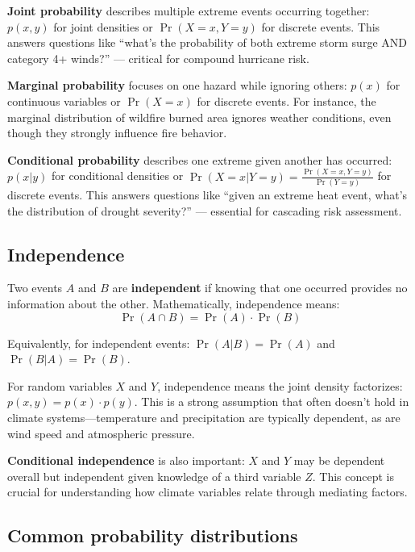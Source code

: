 \documentclass[
  letterpaper,
  DIV=11,
  numbers=noendperiod]{scrreprt}
\begin{document}
\textbf{Joint probability} describes multiple extreme events occurring
together: \(p(x, y)\) for joint densities or \(\Pr(X = x, Y = y)\) for
discrete events. This answers questions like ``what's the probability of
both extreme storm surge AND category 4+ winds?'' --- critical for
compound hurricane risk.

\textbf{Marginal probability} focuses on one hazard while ignoring
others: \(p(x)\) for continuous variables or \(\Pr(X = x)\) for discrete
events. For instance, the marginal distribution of wildfire burned area
ignores weather conditions, even though they strongly influence fire
behavior.

\textbf{Conditional probability} describes one extreme given another has
occurred: \(p(x | y)\) for conditional densities or
\(\Pr(X = x | Y = y) = \frac{\Pr(X = x, Y = y)}{\Pr(Y = y)}\) for
discrete events. This answers questions like ``given an extreme heat
event, what's the distribution of drought severity?'' --- essential for
cascading risk assessment.

\subsection{Independence}\label{independence}

Two events \(A\) and \(B\) are \textbf{independent} if knowing that one
occurred provides no information about the other. Mathematically,
independence means: \[\Pr(A \cap B) = \Pr(A) \cdot \Pr(B)\]

Equivalently, for independent events: \(\Pr(A | B) = \Pr(A)\) and
\(\Pr(B | A) = \Pr(B)\).

For random variables \(X\) and \(Y\), independence means the joint
density factorizes: \(p(x, y) = p(x) \cdot p(y)\). This is a strong
assumption that often doesn't hold in climate systems---temperature and
precipitation are typically dependent, as are wind speed and atmospheric
pressure.

\textbf{Conditional independence} is also important: \(X\) and \(Y\) may
be dependent overall but independent given knowledge of a third variable
\(Z\). This concept is crucial for understanding how climate variables
relate through mediating factors.

\subsection{Common probability
distributions}\label{common-probability-distributions}
\end{document}
